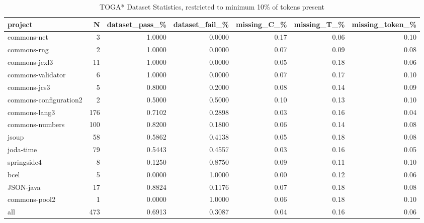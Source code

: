 \begin{table*}
\centering
\caption{TOGA* Dataset Statistics, restricted to minimum 10\% of tokens present}
\label{tab:toga_stats_10}
\begin{tabular}{lrrrrrr}
\toprule
                project &    N &  dataset\_pass\_\% &  dataset\_fail\_\% &  missing\_C\_\% &  missing\_T\_\% &  missing\_token\_\% \\
\midrule
            commons-net &    3 &          1.0000 &          0.0000 &         0.17 &         0.06 &             0.10 \\
            commons-rng &    2 &          1.0000 &          0.0000 &         0.07 &         0.09 &             0.08 \\
          commons-jexl3 &   11 &          1.0000 &          0.0000 &         0.05 &         0.18 &             0.06 \\
      commons-validator &    6 &          1.0000 &          0.0000 &         0.07 &         0.17 &             0.10 \\
           commons-jcs3 &    5 &          0.8000 &          0.2000 &         0.08 &         0.14 &             0.09 \\
 commons-configuration2 &    2 &          0.5000 &          0.5000 &         0.10 &         0.13 &             0.10 \\
          commons-lang3 &  176 &          0.7102 &          0.2898 &         0.03 &         0.16 &             0.04 \\
        commons-numbers &  100 &          0.8200 &          0.1800 &         0.06 &         0.14 &             0.08 \\
                  jsoup &   58 &          0.5862 &          0.4138 &         0.05 &         0.18 &             0.08 \\
              joda-time &   79 &          0.5443 &          0.4557 &         0.03 &         0.16 &             0.05 \\
            springside4 &    8 &          0.1250 &          0.8750 &         0.09 &         0.11 &             0.10 \\
                   bcel &    5 &          0.0000 &          1.0000 &         0.00 &         0.12 &             0.06 \\
              JSON-java &   17 &          0.8824 &          0.1176 &         0.07 &         0.18 &             0.08 \\
          commons-pool2 &    1 &          0.0000 &          1.0000 &         0.06 &         0.18 &             0.10 \\
                    all &  473 &          0.6913 &          0.3087 &         0.04 &         0.16 &             0.06 \\
\bottomrule
\end{tabular}
\end{table*}
